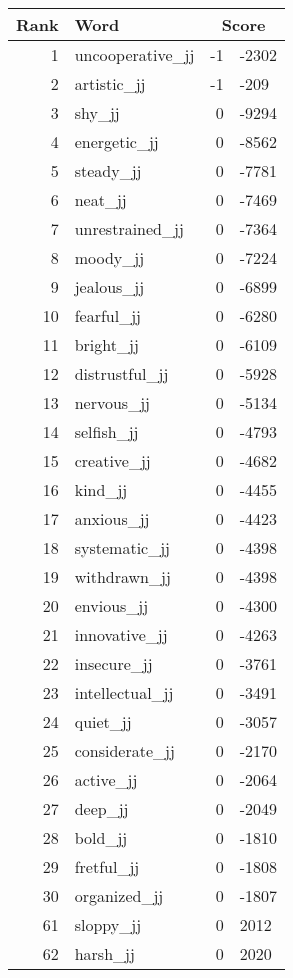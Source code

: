 \begin{longtable}[!htbp]{| rlr@{.}l |}
    \hline
    \textbf{Rank} & \textbf{Word} & \multicolumn{2}{c|}{\textbf{Score}} \\
    \hline
    \endhead
    1 & uncooperative\_jj & -1 & -2302 \\
    2 & artistic\_jj & -1 & -209 \\
    3 & shy\_jj & 0 & -9294 \\
    4 & energetic\_jj & 0 & -8562 \\
    5 & steady\_jj & 0 & -7781 \\
    6 & neat\_jj & 0 & -7469 \\
    7 & unrestrained\_jj & 0 & -7364 \\
    8 & moody\_jj & 0 & -7224 \\
    9 & jealous\_jj & 0 & -6899 \\
    10 & fearful\_jj & 0 & -6280 \\
    11 & bright\_jj & 0 & -6109 \\
    12 & distrustful\_jj & 0 & -5928 \\
    13 & nervous\_jj & 0 & -5134 \\
    14 & selfish\_jj & 0 & -4793 \\
    15 & creative\_jj & 0 & -4682 \\
    16 & kind\_jj & 0 & -4455 \\
    17 & anxious\_jj & 0 & -4423 \\
    18 & systematic\_jj & 0 & -4398 \\
    19 & withdrawn\_jj & 0 & -4398 \\
    20 & envious\_jj & 0 & -4300 \\
    21 & innovative\_jj & 0 & -4263 \\
    22 & insecure\_jj & 0 & -3761 \\
    23 & intellectual\_jj & 0 & -3491 \\
    24 & quiet\_jj & 0 & -3057 \\
    25 & considerate\_jj & 0 & -2170 \\
    26 & active\_jj & 0 & -2064 \\
    27 & deep\_jj & 0 & -2049 \\
    28 & bold\_jj & 0 & -1810 \\
    29 & fretful\_jj & 0 & -1808 \\
    30 & organized\_jj & 0 & -1807 \\
    61 & sloppy\_jj & 0 & 2012 \\
    62 & harsh\_jj & 0 & 2020 \\

\end{longtable}
